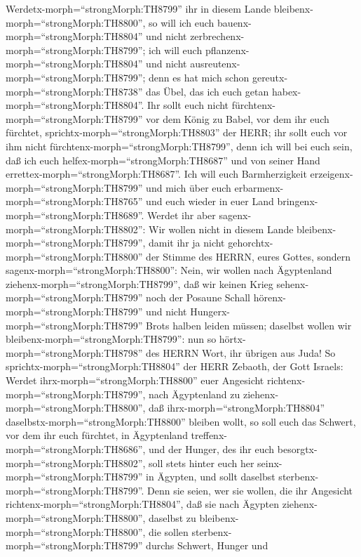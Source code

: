 Werdetx-morph=``strongMorph:TH8799'' ihr in diesem Lande
bleibenx-morph=``strongMorph:TH8800'', so will ich euch
bauenx-morph=``strongMorph:TH8804'' und nicht
zerbrechenx-morph=``strongMorph:TH8799''; ich will euch
pflanzenx-morph=``strongMorph:TH8804'' und nicht
ausreutenx-morph=``strongMorph:TH8799''; denn es hat mich schon
gereutx-morph=``strongMorph:TH8738'' das Übel, das ich euch getan
habex-morph=``strongMorph:TH8804''.  Ihr sollt euch nicht
fürchtenx-morph=``strongMorph:TH8799'' vor dem König zu Babel, vor dem
ihr euch fürchtet, sprichtx-morph=``strongMorph:TH8803'' der HERR; ihr
sollt euch vor ihm nicht fürchtenx-morph=``strongMorph:TH8799'', denn
ich will bei euch sein, daß ich euch helfex-morph=``strongMorph:TH8687''
und von seiner Hand errettex-morph=``strongMorph:TH8687''. 
Ich will euch Barmherzigkeit erzeigenx-morph=``strongMorph:TH8799'' und
mich über euch erbarmenx-morph=``strongMorph:TH8765'' und euch wieder in
euer Land bringenx-morph=``strongMorph:TH8689''.  Werdet
ihr aber sagenx-morph=``strongMorph:TH8802'': Wir wollen nicht in diesem
Lande bleibenx-morph=``strongMorph:TH8799'', damit ihr ja nicht
gehorchtx-morph=``strongMorph:TH8800'' der Stimme des HERRN, eures
Gottes,  sondern sagenx-morph=``strongMorph:TH8800'': Nein,
wir wollen nach Ägyptenland ziehenx-morph=``strongMorph:TH8799'', daß
wir keinen Krieg sehenx-morph=``strongMorph:TH8799'' noch der Posaune
Schall hörenx-morph=``strongMorph:TH8799'' und nicht
Hungerx-morph=``strongMorph:TH8799'' Brots halben leiden müssen;
daselbst wollen wir bleibenx-morph=``strongMorph:TH8799'': 
nun so hörtx-morph=``strongMorph:TH8798'' des HERRN Wort, ihr übrigen
aus Juda! So sprichtx-morph=``strongMorph:TH8804'' der HERR Zebaoth, der
Gott Israels: Werdet ihrx-morph=``strongMorph:TH8800'' euer Angesicht
richtenx-morph=``strongMorph:TH8799'', nach Ägyptenland zu
ziehenx-morph=``strongMorph:TH8800'', daß
ihrx-morph=``strongMorph:TH8804'' daselbstx-morph=``strongMorph:TH8800''
bleiben wollt,  so soll euch das Schwert, vor dem ihr euch
fürchtet, in Ägyptenland treffenx-morph=``strongMorph:TH8686'', und der
Hunger, des ihr euch besorgtx-morph=``strongMorph:TH8802'', soll stets
hinter euch her seinx-morph=``strongMorph:TH8799'' in Ägypten, und sollt
daselbst sterbenx-morph=``strongMorph:TH8799''.  Denn sie
seien, wer sie wollen, die ihr Angesicht
richtenx-morph=``strongMorph:TH8804'', daß sie nach Ägypten
ziehenx-morph=``strongMorph:TH8800'', daselbst zu
bleibenx-morph=``strongMorph:TH8800'', die sollen
sterbenx-morph=``strongMorph:TH8799'' durchs Schwert, Hunger und
